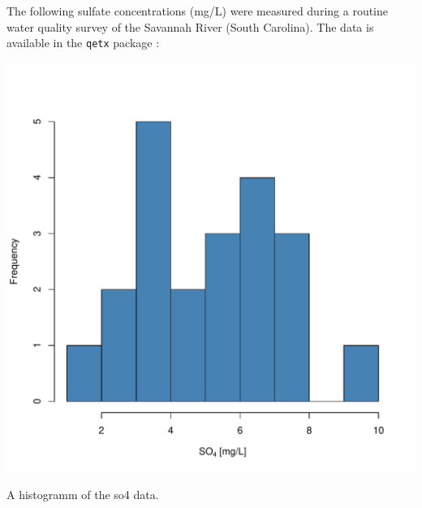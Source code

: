 \documentclass{tufte-book}
\begin{document}
The following sulfate concentrations (mg/L) were measured during a routine 
water quality survey of the Savannah River (South Carolina). 
The data is available in the \verb|qetx| package :

\begin{knitrout}
\color{fgcolor}\begin{kframe}
\begin{alltt}
\end{alltt}
\end{kframe}
\end{knitrout}



\begin{marginfigure}
\vspace{10mm}
\begin{knitrout}
\color{fgcolor}

{\centering \includegraphics[width=\linewidth]{graphics/so4_hist} 

}



\end{knitrout}

\caption{A histogramm of the so4 data.}
\end{marginfigure}
\end{document}

